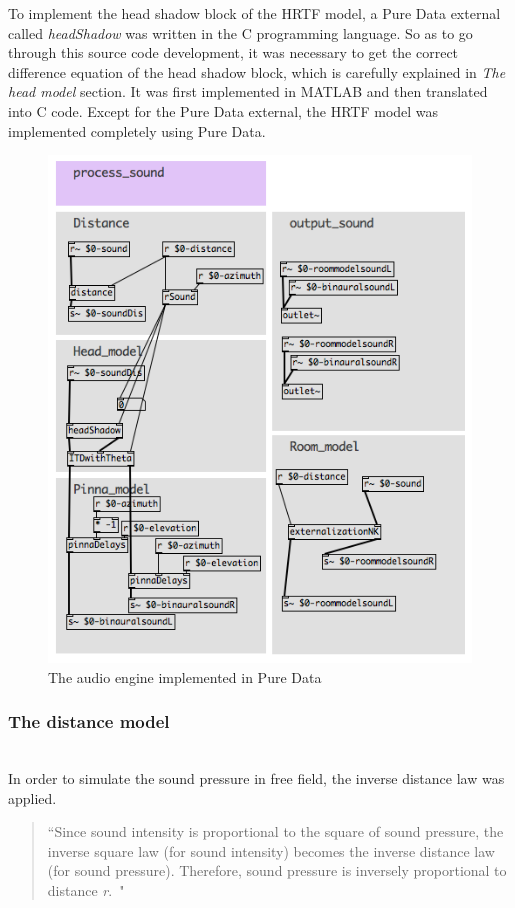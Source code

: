 \documentclass[journal]{IEEEtran}
\begin{document}
To implement the head shadow block of the HRTF model, a Pure Data external called \emph{headShadow} was written in the C programming language. So as to go through this source code development, it was necessary to get the correct difference equation of the head shadow block, which is carefully explained in \emph{The head model} section. It was first implemented in MATLAB and then translated into C code. Except for the Pure Data external, the HRTF model was implemented completely using Pure Data.

\begin{figure}[h!]
\centering
\includegraphics[scale=0.5]{graphics/audioengine.png}
\caption{The audio engine implemented in Pure Data}
\label{fig:augioengine}
\end{figure}

\subsubsection{The distance model}~\\
In order to simulate the sound pressure in free field, the inverse distance law was applied. 

\begin{quote}
``Since sound intensity is proportional to the square of sound pressure, the inverse square law (for sound intensity) becomes the inverse distance law (for sound pressure). Therefore, sound pressure is inversely proportional to distance \textit{r}.~\cite{everest2009master}"
\end{quote}
\end{document}
